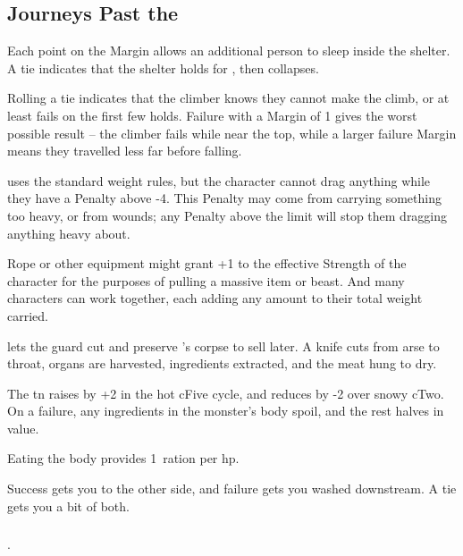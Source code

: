 \begin{multicols}{2}
\columnbreak

\subsection{Journeys Past the }

Each point on the Margin allows an additional person to sleep inside the shelter.
A tie indicates that the shelter holds for , then collapses.


Rolling a tie indicates that the climber knows they cannot make the climb, or at least fails on the first few holds.
Failure with a Margin of 1 gives the worst possible result -- the climber fails while near the top, while a larger failure Margin means they travelled less far before falling.

uses the standard \gls{weight} rules, but the character cannot drag anything while they have a Penalty above -4.
This Penalty may come from carrying something too heavy, or from wounds; any Penalty above the limit will stop them dragging anything heavy about.

Rope or other equipment might grant +1 to the effective Strength of the character for the purposes of pulling a massive item or beast.
And many characters can work together, each adding any amount to their total \gls{weight} carried.

lets the \gls{guard} cut and preserve 's corpse to sell later.
A knife cuts from arse to throat, organs are harvested, \glspl{ingredient} extracted, and the meat hung to dry.

The \gls{tn} raises by +2 in the hot \gls{cFive} \gls{cycle}, and reduces by -2 over snowy \gls{cTwo}.
On a failure, any \glspl{ingredient} in the \gls{monster}'s body spoil, and the rest halves in value.

Eating the body provides 1~\gls{ration} per \gls{hp}.

Success gets you to the other side, and failure gets you washed downstream.
A tie gets you a bit of both.

\subsubsection{}
%
.


\end{multicols}
